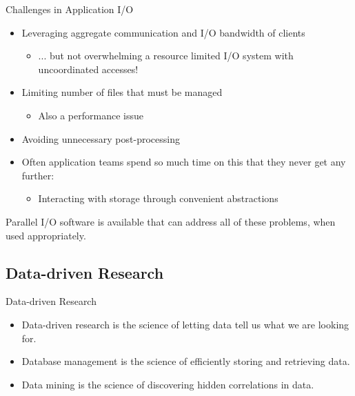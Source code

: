 \documentclass[compress,11pt,xcolor=svgnames,aspectratio=169]{beamer}
\begin{document}
\begin{frame}[t]{Challenges in Application I/O}

\begin{itemize}
\setlength\itemsep{0.4cm}

\item Leveraging aggregate communication and I/O bandwidth of clients
    \begin{itemize}
        \item ... but not overwhelming a resource limited I/O system with uncoordinated accesses!
    \end{itemize}

\item Limiting number of files that must be managed
    \begin{itemize}
      \item Also a performance issue
    \end{itemize}

\item Avoiding unnecessary post-processing

\item Often application teams spend so much time on this that they never get any further:
    \begin{itemize}
      \item Interacting with storage through convenient abstractions
    \end{itemize}

\end{itemize}

Parallel I/O software is available that can address all
of these problems, when used appropriately.


\end{frame}

\subsection{Data-driven Research}

\begin{frame}[t]{Data-driven Research}

\begin{itemize}
\setlength\itemsep{1cm}

  \item Data-driven research is the science of letting data tell us what we are looking for.

  \item Database management is the science of efficiently storing and retrieving data.

  \item Data mining is the science of discovering hidden correlations in data.

\end{itemize}

\end{frame}
\end{document}
